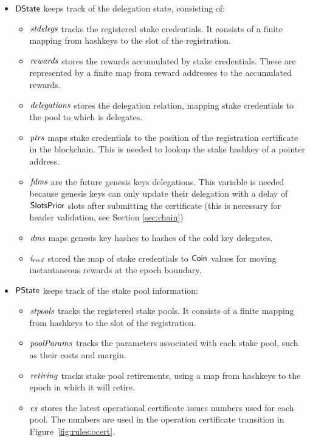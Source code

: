 \begin{itemize}
  \item $\mathsf{DState}$ keeps track of the delegation state, consisting of:
    \begin{itemize}
    \item $\mathit{stdelegs}$ tracks the registered stake credentials. It consists
      of a finite mapping from hashkeys to the slot of the registration.
    \item $\mathit{rewards}$ stores the rewards accumulated by stake credentials.
      These are represented by a finite map from reward addresses to the
      accumulated rewards.
    \item $\mathit{delegations}$ stores the delegation relation, mapping stake
      credentials to the pool to which is delegates.
    \item $\mathit{ptrs}$ maps stake credentials to the position of the
      registration certificate in the blockchain. This is needed to lookup the
      stake hashkey of a pointer address.
      \item $\mathit{fdms}$ are the future genesis keys delegations. This variable
      is needed because genesis keys can only update their delegation with a
      delay of $\mathsf{SlotsPrior}$ slots after submitting the certificate (this is
      necessary for header validation, see Section \ref{sec:chain})
      \item $\mathit{dms}$ maps genesis key hashes to hashes of the cold key
        delegates.
      \item $\mathit{i_{rwd}}$ stored the map of stake credentials to $\mathsf{Coin}$
        values for moving instantaneous rewards at the epoch boundary.
    \end{itemize}
  \item $\mathsf{PState}$ keeps track of the stake pool information:
    \begin{itemize}
      \item $\mathit{stpools}$ tracks the registered stake pools. It consists of a finite
        mapping from hashkeys to the slot of the registration.
      \item $\mathit{poolParams}$ tracks the parameters associated with each stake pool, such as
        their costs and margin.
      \item $\mathit{retiring}$ tracks stake pool retirements, using a map from hashkeys to
        the epoch in which it will retire.
      \item $\mathit{cs}$ stores the latest operational certificate issues numbers used for each pool.
        The numbers are used in the operation certificate transition
        in Figure~\ref{fig:rules:ocert}.
    \end{itemize}
\end{itemize}

